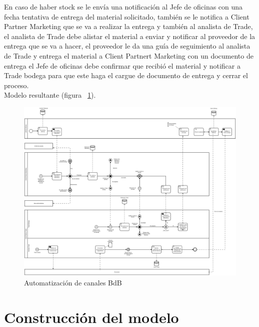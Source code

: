 En caso de haber stock se le envía una notificación al Jefe de oficinas con una fecha tentativa de entrega del material solicitado, también se le notifica a Client Partner Marketing que se va a realizar la entrega y también al analista de Trade, el analista de Trade debe alistar el material a enviar y notificar al proveedor de la entrega que se va a hacer, el proveedor le da una guía de seguimiento al analista de Trade y entrega el material a Client Partnert Marketing con un documento de entrega el Jefe de oficinas debe confirmar que recibió el material y notificar a Trade bodega para que este haga el cargue de documento de entrega y cerrar el proceso.\\

Modelo resultante (figura ~\ref{ABdB}).

\begin{figure}
	\centering
	\includegraphics[scale=0.2]{Capitulo4/imagenes/diagram.png}
	\caption{Automatización de canales BdB }
	\label{ABdB}
\end{figure}

\section{Construcción del modelo}

